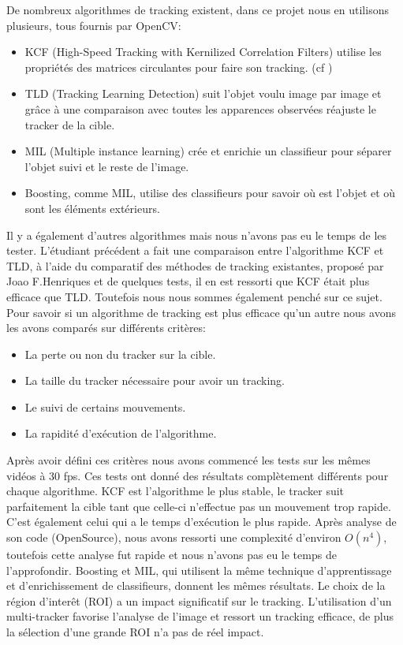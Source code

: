 De nombreux algorithmes de tracking existent, dans ce projet nous en utilisons plusieurs, tous fournis par OpenCV:
\begin{itemize}
\item KCF (High-Speed Tracking with Kernilized Correlation Filters) utilise les propriétés des matrices circulantes pour faire son tracking. (cf \cite{kernelized_correlation_filters})
\item TLD (Tracking Learning Detection) suit l'objet voulu image par image et grâce à une comparaison avec toutes les apparences observées réajuste le tracker de la cible. 
\item MIL (Multiple instance learning) crée et enrichie un classifieur pour sé\-pa\-rer l'objet suivi et le reste de l'image.
\item Boosting, comme MIL, utilise des classifieurs pour savoir où est l'objet et où sont les éléments extérieurs. 
\end{itemize}
Il y a également d'autres algorithmes mais nous n'avons pas eu le temps de les tester.
L'étudiant précédent a fait une comparaison entre l'algorithme KCF et TLD, à l'aide du comparatif des méthodes de tracking existantes, proposé par Joao F.Henriques et de quelques tests, il en est ressorti que KCF était plus efficace que TLD. 
Toutefois nous nous sommes également penché sur ce sujet. Pour savoir si un algorithme de tracking est plus efficace qu'un autre nous avons les avons comparés sur différents critères: 
\begin{itemize}
\item La perte ou non du tracker sur la cible.
\item La taille du tracker nécessaire pour avoir un tracking.
\item Le suivi de certains mouvements.
\item La rapidité d'exécution de l'algorithme.
\end{itemize}
Après avoir défini ces critères nous avons commencé les tests sur les mêmes vidéos à 30 fps. Ces tests ont donné des résultats complètement différents pour chaque algorithme.
KCF est l'algorithme le plus stable, le tracker suit parfaitement la cible tant que celle-ci n'effectue pas un mouvement trop rapide. C'est également celui qui a le temps d'exécution le plus rapide. Après analyse de son code (OpenSource), nous avons ressorti une complexité d'environ $O(n^{4})$, toutefois cette analyse fut rapide et nous n'avons pas eu le temps de l'approfondir.
Boosting et MIL, qui utilisent la même technique d'apprentissage et d'enrichissement de classifieurs, donnent les mêmes résultats. Le choix de la région d'interêt (ROI) a un impact significatif sur le tracking. L'utilisation d'un multi-tracker favorise l'analyse de l'image et ressort un tracking efficace, de plus la sélection d'une grande ROI n'a pas de réel impact.
